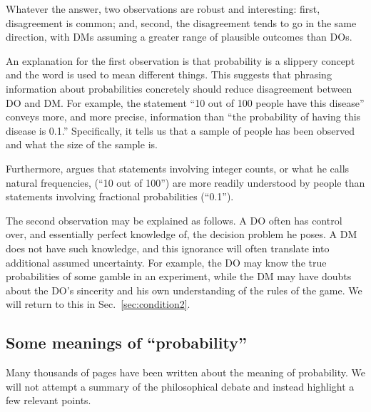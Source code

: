 \documentclass[a4paper, 12pt]{article}
\newcommand{\seclabel}[1]{\label{sec:#1}}
\newcommand{\secref}[1]{Sec.~\ref{sec:#1}}
\newcommand{\ie}{\textit{i.e.}\xspace}
\newcommand{\eg}{\textit{e.g.}\xspace}
\begin{document}
Whatever the answer, two observations are robust and interesting: first, disagreement is common; and, second, the disagreement tends to go in the same direction, with DMs assuming a greater range of plausible outcomes than DOs.

An explanation for the first observation is that probability is a slippery concept and the word is used to mean different things. This suggests that phrasing information about probabilities concretely should reduce disagreement between DO and DM. For example, the statement ``10 out of 100 people have this disease'' conveys more, and more precise, information than ``the probability of having this disease is 0.1.'' Specifically, it tells us that a sample of people has been observed and what the size of the sample is.

Furthermore, \textcite{Gigerenzer2018} argues that statements involving integer counts, or what he calls natural frequencies,  (``10 out of 100'') are more readily understood by people than statements involving fractional probabilities (``0.1'').

The second observation may be explained as follows. A DO often has control over, and essentially perfect knowledge of, the decision problem he poses. A DM does not have such knowledge, and this ignorance will often translate into additional assumed uncertainty. For example, the DO may know the true probabilities of some gamble in an experiment, while the DM may have doubts about the DO's sincerity and his own understanding of the rules of the game. We will return to this in \secref{condition2}.

\subsection{Some meanings of ``probability'' \seclabel{tricky}}
Many thousands of pages have been written about the meaning of probability. We will not attempt a summary of the philosophical debate and instead highlight a few relevant points.

\end{document}
